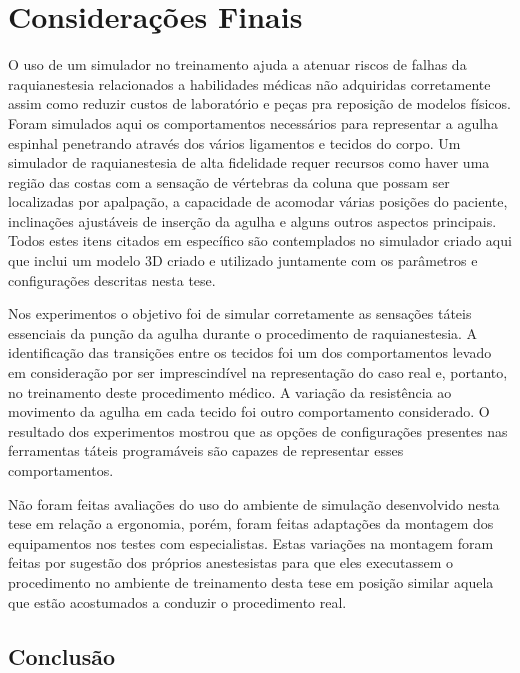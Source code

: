 \chapter{Considerações Finais} \label{cap:cap7}

O uso de um simulador no treinamento ajuda a atenuar riscos de falhas da raquianestesia relacionados a habilidades médicas não adquiridas corretamente assim como reduzir custos de laboratório e peças pra reposição de modelos físicos. Foram simulados aqui os comportamentos necessários para representar a agulha espinhal penetrando através dos vários ligamentos e tecidos do corpo. Um simulador de raquianestesia de alta fidelidade requer recursos como haver uma região das costas com a sensação de vértebras da coluna que possam ser localizadas por apalpação, a capacidade de acomodar várias posições do paciente, inclinações ajustáveis de inserção da agulha e alguns outros aspectos principais. Todos estes itens citados em específico são contemplados no simulador criado aqui que inclui um modelo 3D criado e utilizado juntamente com os parâmetros e configurações descritas nesta tese. 

Nos experimentos o objetivo foi de simular corretamente as sensações táteis essenciais da punção da agulha durante o procedimento de raquianestesia. A identificação das transições entre os tecidos foi um dos comportamentos levado em consideração por ser imprescindível na representação do caso real e, portanto, no treinamento deste procedimento médico.
A variação da resistência ao movimento da agulha em cada tecido foi outro comportamento considerado. O resultado dos experimentos mostrou que as opções de configurações presentes nas ferramentas táteis programáveis são capazes de representar esses comportamentos.

Não foram feitas avaliações do uso do ambiente de simulação desenvolvido nesta tese em relação a ergonomia, porém, foram feitas adaptações da montagem dos equipamentos nos testes com especialistas. Estas variações na montagem foram feitas por sugestão dos próprios anestesistas para que eles executassem o procedimento no ambiente de treinamento desta tese em posição similar aquela que estão acostumados a conduzir o procedimento real.

\section{Conclusão}
\label{sec:conclusão}

